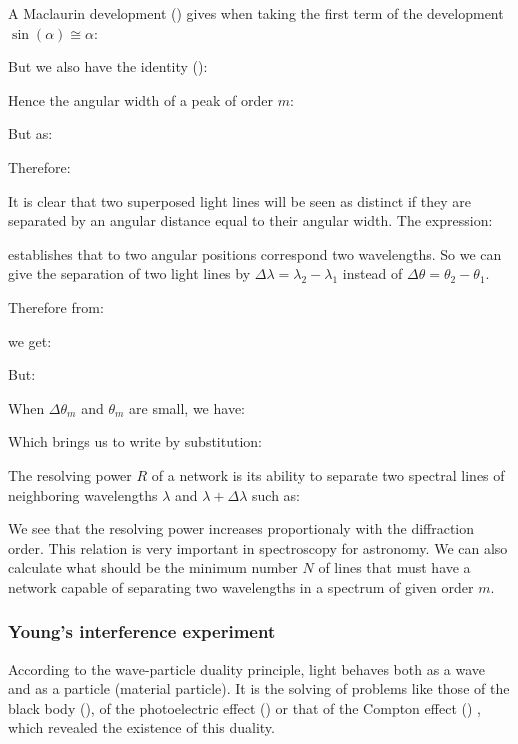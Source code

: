 	A Maclaurin development () gives when taking the first term of the development $\sin(\alpha)\cong \alpha$:
	
	But we also have the identity ():
	
	Hence the angular width of a peak of order $m$:
	
	But as:
	
	Therefore:
	
	It is clear that two superposed light lines will be seen as distinct if they are separated by an angular distance equal to their angular width. The expression:
	
	establishes that to two angular positions correspond two wavelengths. So we can give the separation of two light lines by $\Delta \lambda=\lambda_2-\lambda_1$ instead of $\Delta\theta=\theta_2-\theta_1$.
	
	Therefore from:
	
	we get:
	
	But:
	
	When $\Delta \theta_m$ and $\theta_m$ are small, we have:
	
	Which brings us to write by substitution:
	
	The resolving power $R$ of a network is its ability to separate two spectral lines of neighboring wavelengths $\lambda$ and $\lambda+\Delta\lambda$ such as:
	
	We see that the resolving power increases proportionaly with the diffraction order. This relation is very important in spectroscopy for astronomy. We can also calculate what should be the minimum number $N$ of lines that must have a network capable of separating two wavelengths in a spectrum of given order $m$.
	
	\subsubsection{Young's interference experiment}\label{young interference experiment}
	According to the wave-particle duality principle, light behaves both as a wave and as a particle (material particle). It is the solving of problems like those of the black body (), of the photoelectric effect () or that of the Compton effect () , which revealed the existence of this duality.

